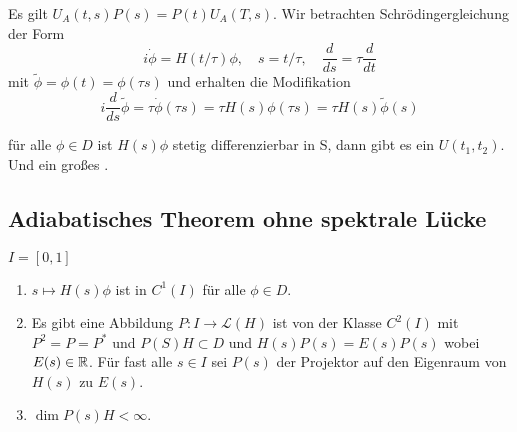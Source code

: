 \documentclass{mycourse}
\begin{document}
Es gilt $U_A(t,s) P(s)=P(t) U_A(T,s)$. Wir betrachten Schrödingergleichung der Form
\[
i \dot \phi = H(t/ \tau) \phi, \quad s=t/\tau, \quad \frac{d}{ds} = \tau \frac{d}{dt}
\]
mit $\tilde \phi = \phi(t) = \phi(\tau s)$ und erhalten die Modifikation
\[
i \frac{d}{ds} \tilde \phi = \tau \dot \phi (\tau s) = \tau H(s)  \phi(\tau s) = \tau H(s) \tilde \phi(s)
\]

\begin{seg}[Annahm]
für alle $\phi \in D$ ist $H(s) \phi$ stetig differenzierbar in S, dann gibt es ein $U(t_1, t_2)$.
Und ein großes \fixme[fig2].
\end{seg}

\subsection{Adiabatisches Theorem ohne spektrale Lücke}

\begin{seg}[Annahmen]
$I=[0,1]$
\begin{enumerate}[i]
\item $s\mapsto H(s) \phi$ ist in $C^1(I)$ für alle $\phi \in D$.
\item Es gibt eine Abbildung $P: I \to \mathcal L(H)$ ist von der Klasse $C^2(I)$ mit $P^2= P= P^*$ und $P(S) H \subset D$ und $H(s) P(s)= E(s) P(s)$ wobei $E(s) \in \mathbb{R}$. Für fast alle $s\in I$ sei $P(s)$ der Projektor auf den Eigenraum von $H(s)$ zu $E(s)$.
\item $\dim P(s) H < \infty$.
\end{enumerate}
\end{seg}
\end{document}

